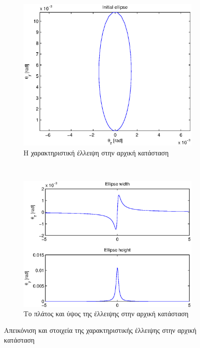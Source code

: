 \begin{figure}[tph]	
	\begin{subfigure}{0.45\textwidth}
		\includegraphics[width=0.9\linewidth]{figures/beam-deflection-script-01-initial-elipse}
		\centering
		\caption{Η χαρακτηριστική έλλειψη στην αρχική κατάσταση}
		\label{fig:beam-deflection-script-01-initial-elipse}
	\end{subfigure}
	~
	\begin{subfigure}{0.45\textwidth}
		\includegraphics[width=0.9\linewidth]{figures/beam-deflection-script-02-elipse-width}
		\centering
		\caption{Το πλάτος και ύψος της έλλειψης στην αρχική κατάσταση}
		\label{fig:beam-deflection-script-02-elipse-width}
	\end{subfigure}
\caption{Απεικόνιση και στοιχεία της χαρακτηριστικής έλλειψης στην αρχική κατάσταση}
\label{fig:initial-ellipse}
\end{figure}

